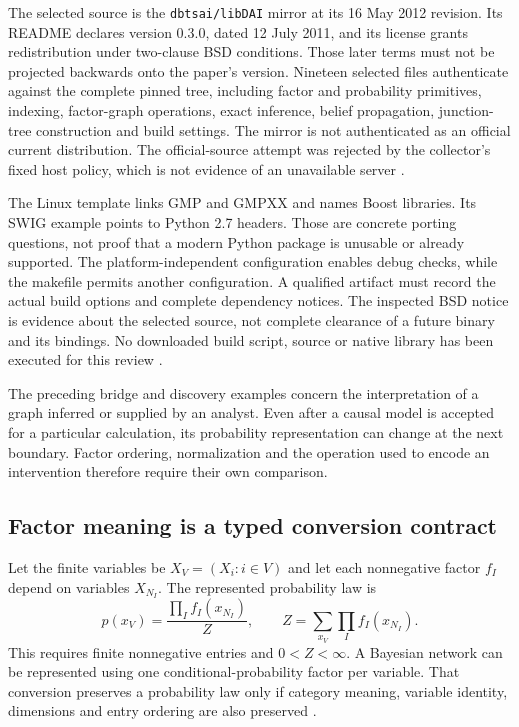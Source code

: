 The selected source is the \texttt{dbtsai/libDAI} mirror at its 16 May 2012
revision. Its README declares version 0.3.0, dated 12 July 2011, and its
license grants redistribution under two-clause BSD conditions. Those later
terms must not be projected backwards onto the paper's version. Nineteen
selected files authenticate against the complete pinned tree, including
factor and probability primitives, indexing, factor-graph operations, exact
inference, belief propagation, junction-tree construction and build settings.
The mirror is not authenticated as an official current distribution. The
official-source attempt was rejected by the collector's fixed host policy,
which is not evidence of an unavailable server
\citep{exec24_libdai_source,exec24_libdai_choice}.

The Linux template links GMP and GMPXX and names Boost libraries. Its SWIG
example points to Python 2.7 headers. Those are concrete porting questions,
not proof that a modern Python package is unusable or already supported.
The platform-independent configuration enables debug checks, while the
makefile permits another configuration. A qualified artifact must record
the actual build options and complete dependency notices. The inspected BSD
notice is evidence about the selected source, not complete clearance of a
future binary and its bindings. No downloaded build script, source or native
library has been executed for this review \citep{exec24_libdai_source}.

The preceding bridge and discovery examples concern the interpretation of a
graph inferred or supplied by an analyst. Even after a causal model is
accepted for a particular calculation, its probability representation can
change at the next boundary. Factor ordering, normalization and the operation
used to encode an intervention therefore require their own comparison.

\subsection{Factor meaning is a typed conversion contract}
Let the finite variables be $X_V=(X_i:i\in V)$ and let each nonnegative factor
$f_I$ depend on variables $X_{N_I}$. The represented probability law is
\[
 p(x_V)=\frac{\prod_I f_I(x_{N_I})}{Z},\qquad
 Z=\sum_{x_V}\prod_I f_I(x_{N_I}).
\]
This requires finite nonnegative entries and $0<Z<\infty$. A Bayesian network
can be represented using one conditional-probability factor per variable.
That conversion preserves a probability law only if category meaning,
variable identity, dimensions and entry ordering are also preserved
\citep{exec24_libdai_paper,exec24_libdai_source}.

